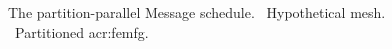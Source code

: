 \begin{figure}
	\caption[The partition-parallel Message schedule.]{The partition-parallel Message schedule. \protect{}~Hypothetical mesh. \protect{}~Partitioned \gls{acr:femfg}. }
	\label{fig:partPar}
\end{figure}



